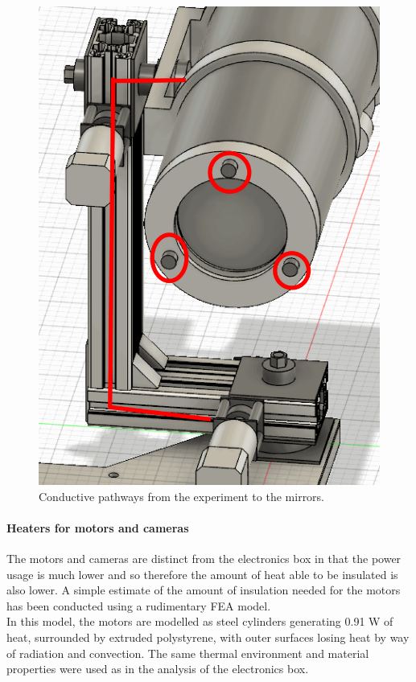 	\begin{figure}[H]
    \centering	
	\includegraphics[scale=0.5]{4-experiment-design/img/mechanical/thermalpaths.PNG}
	\caption{Conductive pathways from the experiment to the mirrors.}
	\label{fig:thermalpaths}
    	\end{figure}


\paragraph{Heaters for motors and cameras}
The motors and cameras are distinct from the electronics box in that the power usage is much lower and so therefore the amount of heat able to be insulated is also lower. A simple estimate of the amount of insulation needed for the motors has been conducted using a rudimentary FEA model.\\

In this model, the motors are modelled as steel cylinders generating 0.91 W of heat, surrounded by extruded polystyrene, with outer surfaces losing heat by way of radiation and convection. The same thermal environment and material properties were used as in the analysis of the electronics box.\\

